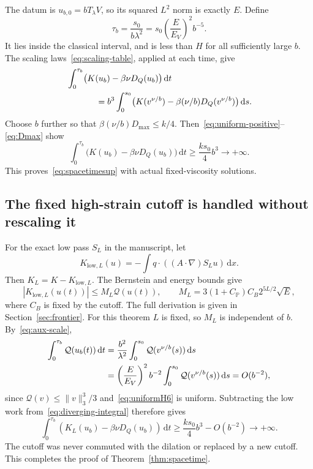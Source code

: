 \documentclass[11pt,a4paper]{article}
\theoremstyle{definition}
\newcommand{\Q}{\mathcal Q}
\newcommand{\PP}{\mathbb P}
\newcommand{\dd}{\,\mathrm dx}
\newcommand{\dt}{\,\mathrm dt}
\newcommand{\ds}{\,\mathrm ds}
\begin{document}
The datum is $u_{b,0}=bT_\lambda V$, so its squared $L^2$ norm is exactly $E$. Define
\begin{equation}\label{eq:taub}
 \tau_b=\frac{s_0}{b\lambda^2}
 =s_0\left(\frac E{E_V}\right)^2b^{-5}.
\end{equation}
It lies inside the classical interval, and is less than $H$ for all sufficiently large $b$. The scaling laws~\eqref{eq:scaling-table}, applied at each time, give
\begin{align}
 &\int_0^{\tau_b}\bigl(K(u_b)-\beta\nu D_Q(u_b)\bigr)\dt\notag\\
 &\hspace{12mm}=b^3\int_0^{s_0}
     \bigl(K(v^{\nu/b})-\beta(\nu/b)D_Q(v^{\nu/b})\bigr)\ds.
 \label{eq:spacetime-scale}
\end{align}
Choose $b$ further so that $\beta(\nu/b)D_{\max}\le k/4$. Then~\eqref{eq:uniform-positive}--\eqref{eq:Dmax} show
\begin{equation}\label{eq:diverging-integral}
 \int_0^{\tau_b}\bigl(K(u_b)-\beta\nu D_Q(u_b)\bigr)\dt
 \ge\frac{k s_0}{4}b^3\longrightarrow+\infty.
\end{equation}
This proves~\eqref{eq:spacetimesup} with actual fixed-viscosity solutions.

\subsection{The fixed high-strain cutoff is handled without rescaling it}
For the exact low pass $S_L$ in the manuscript, let
\[
 K_{\mathrm{low},L}(u)=-\int q\cdot((A\cdot\nabla)S_Lu)\dd.
\]
Then $K_L=K-K_{\mathrm{low},L}$. The Bernstein and energy bounds give
\begin{equation}\label{eq:lowstrain}
 |K_{\mathrm{low},L}(u(t))|\le M_L\Q(u(t)),\qquad
 M_L=3(1+C_{\PP})C_B2^{5L/2}\sqrt E,
\end{equation}
where $C_B$ is fixed by the cutoff. The full derivation is given in Section~\ref{sec:frontier}. For this theorem $L$ is fixed, so $M_L$ is independent of $b$. By~\eqref{eq:aux-scale},
\begin{align}
 \int_0^{\tau_b}\Q(u_b(t))\dt
 &=\frac{b^2}{\lambda^2}\int_0^{s_0}\Q(v^{\nu/b}(s))\ds\notag\\
 &=\left(\frac E{E_V}\right)^2b^{-2}
           \int_0^{s_0}\Q(v^{\nu/b}(s))\ds=O(b^{-2}),\label{eq:small-low}
\end{align}
since $\Q(v)\le\|v\|_3^3/3$ and~\eqref{eq:uniformH6} is uniform. Subtracting the low work from~\eqref{eq:diverging-integral} therefore gives
\[
 \int_0^{\tau_b}(K_L(u_b)-\beta\nu D_Q(u_b))\dt
 \ge\frac{k s_0}{4}b^3-O(b^{-2})\longrightarrow+\infty.
\]
The cutoff was never commuted with the dilation or replaced by a new cutoff. This completes the proof of Theorem~\ref{thm:spacetime}.
\end{document}

